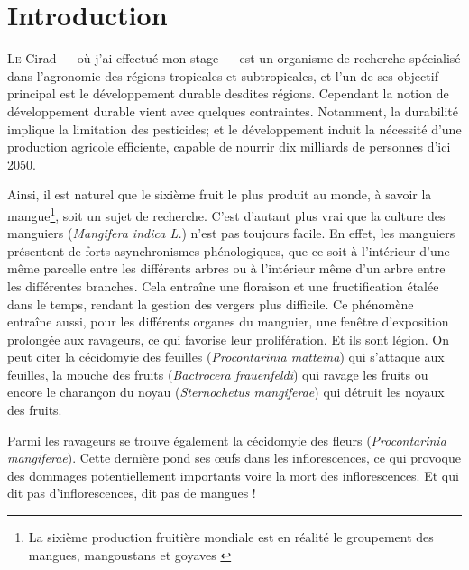 \chapter{Introduction}

\lettrine{L}{e} Cirad --- où j'ai effectué mon stage --- est un organisme de recherche spécialisé dans l'agronomie des régions tropicales et subtropicales, et l'un de ses objectif principal est le développement durable desdites régions.
Cependant la notion de développement durable vient avec quelques contraintes.
Notamment, la durabilité implique la limitation des pesticides; et le développement induit la nécessité d'une production agricole efficiente, capable de nourrir dix milliards de personnes d'ici 2050.

Ainsi, il est naturel que le sixième fruit le plus produit au monde, à savoir la mangue\footnote{La sixième production fruitière mondiale est en réalité le groupement des mangues, mangoustans et goyaves \citep{fao}}, soit un sujet de recherche.
C'est d'autant plus vrai que la culture des manguiers (\emph{Mangifera indica L.}) n'est pas toujours facile.
En effet, les manguiers présentent de forts asynchronismes phénologiques, que ce soit à l'intérieur d'une même parcelle entre les différents arbres ou à l'intérieur même d'un arbre entre les différentes branches.
Cela entraîne une floraison et une fructification étalée dans le temps, rendant la gestion des vergers plus difficile.
Ce phénomène entraîne aussi, pour les différents organes du manguier, une fenêtre d'exposition prolongée aux ravageurs, ce qui favorise leur prolifération.
Et ils sont légion. On peut citer la cécidomyie des feuilles (\emph{Procontarinia matteina}) qui s'attaque aux feuilles, la mouche des fruits (\emph{Bactrocera frauenfeldi}) qui ravage les fruits ou encore le charançon du noyau (\emph{Sternochetus mangiferae}) qui détruit les noyaux des fruits.

Parmi les ravageurs se trouve également la cécidomyie des fleurs (\emph{Procontarinia mangiferae}). Cette dernière pond ses œufs dans les inflorescences, ce qui provoque des dommages potentiellement importants voire la mort des inflorescences. Et qui dit pas d'inflorescences, dit pas de mangues !


